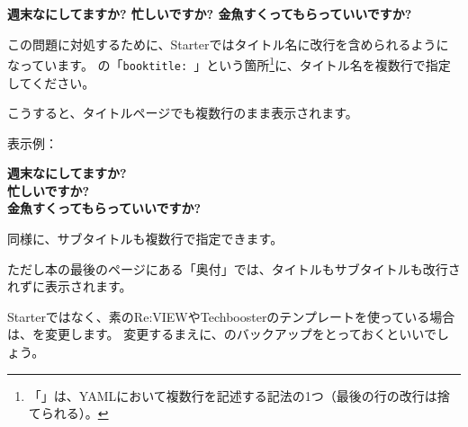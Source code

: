 \begin{center}
  \gtfamily\sffamily\bfseries\ebseries\Huge
  週末なにしてますか?
  忙しいですか?
  金魚すくってもらっていいですか?
\end{center}
\bigskip

この問題に対処するために、Starterではタイトル名に改行を含められるようになっています。
の「\texttt{booktitle: \textbar{}{-}}」という箇所\footnote{「\texttt{\textbar{}{-}}」は、YAMLにおいて複数行を記述する記法の1つ（最後の行の改行は捨てられる）。}に、タイトル名を複数行で指定してください。

\label{}
\begin{starterprogram}\end{starterprogram}

こうすると、タイトルページでも複数行のまま表示されます。

表示例：

\begin{center}
  \gtfamily\sffamily\bfseries\ebseries\Huge
  週末なにしてますか?\\
  忙しいですか?\\
  金魚すくってもらっていいですか?\par
\end{center}
\bigskip

同様に、サブタイトルも複数行で指定できます。

ただし本の最後のページにある「奥付」では、タイトルもサブタイトルも改行されずに表示されます。

Starterではなく、素のRe:VIEWやTechboosterのテンプレートを使っている場合は、を変更します。
変更するまえに、のバックアップをとっておくといいでしょう。

\label{}
\begin{starterprogram}\end{starterprogram}

